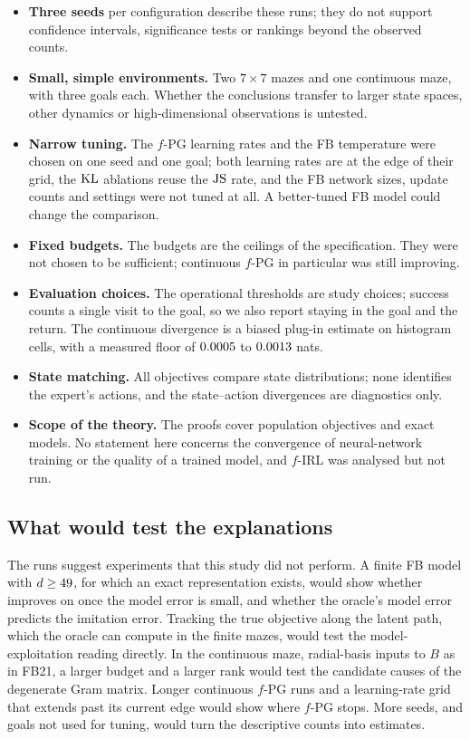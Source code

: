 \begin{itemize}[nosep]
\item \textbf{Three seeds} per configuration describe these runs; they do not support confidence intervals, significance tests or rankings beyond the observed counts.
\item \textbf{Small, simple environments.} Two $7\times7$ mazes and one continuous maze, with three goals each. Whether the conclusions transfer to larger state spaces, other dynamics or high-dimensional observations is untested.
\item \textbf{Narrow tuning.} The $f$-PG learning rates and the FB temperature were chosen on one seed and one goal; both learning rates are at the edge of their grid, the $\KL$ ablations reuse the $\JS$ rate, and the FB network sizes, update counts and \DMFB{} settings were not tuned at all. A better-tuned FB model could change the comparison.
\item \textbf{Fixed budgets.} The budgets are the ceilings of the specification. They were not chosen to be sufficient; continuous $f$-PG in particular was still improving.
\item \textbf{Evaluation choices.} The operational thresholds are study choices; success counts a single visit to the goal, so we also report staying in the goal and the return. The continuous divergence is a biased plug-in estimate on histogram cells, with a measured floor of $\vn{s12.floor.lo}{0.0005}$ to $\vn{s12.floor.hi}{0.0013}$ nats.
\item \textbf{State matching.} All objectives compare state distributions; none identifies the expert's actions, and the state--action divergences are diagnostics only.
\item \textbf{Scope of the theory.} The proofs cover population objectives and exact models. No statement here concerns the convergence of neural-network training or the quality of a trained model, and $f$-IRL was analysed but not run.
\end{itemize}

\subsection{What would test the explanations}

The runs suggest experiments that this study did not perform.
A finite FB model with $d\ge\vn{env.rank.open}{49}$, for which an exact representation exists, would show whether \DMFB{} improves on \ERFB{} once the model error is small, and whether the oracle's model error predicts the imitation error.
Tracking the true \DMFB{} objective along the latent path, which the oracle can compute in the finite mazes, would test the model-exploitation reading directly.
In the continuous maze, radial-basis inputs to $B$ as in FB21, a larger budget and a larger rank would test the candidate causes of the degenerate Gram matrix.
Longer continuous $f$-PG runs and a learning-rate grid that extends past its current edge would show where $f$-PG stops.
More seeds, and goals not used for tuning, would turn the descriptive counts into estimates.
